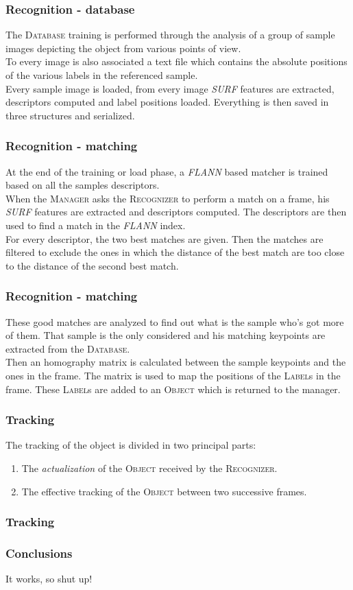 \documentclass{beamer}
\begin{document}
	\begin{frame}
	\frametitle{Recognition - database}
		The \textsc{Database} training is performed through the analysis of a group
		of sample images depicting the object from various points of view.\\
		To every image is also associated a text file which contains the absolute
		positions of the various labels in the referenced sample.\\
		Every sample image is loaded, from every image \emph{SURF} features are
		extracted, descriptors computed and label positions loaded. Everything
		is then saved in three structures and serialized.\\
	\end{frame}

	\begin{frame}
		\frametitle{Recognition - matching}
		At the end of the training or load phase, a \emph{FLANN} based matcher is
		trained based on all the samples descriptors.\\
		When the \textsc{Manager} asks the \textsc{Recognizer} to perform a match
		on a frame, his \emph{SURF} features are extracted and descriptors
		computed. The descriptors are then used to find a match in the
		\emph{FLANN} index.\\
		For every descriptor, the two best matches are given. Then the matches are
		filtered to exclude the ones in which the distance of the best match are
		too close to the distance of the second best match.\\
	\end{frame}

	\begin{frame}
		\frametitle{Recognition - matching}
		These good matches are analyzed to find out what is the sample who's got
		more of them. That sample is the only considered and his matching keypoints
		are extracted from the \textsc{Database}.\\
		Then an homography matrix is calculated between the sample keypoints and the
		ones in the frame. The matrix is used to map the positions of the
		\textsc{Label}s in the frame. These \textsc{Label}s are added to an
		\textsc{Object} which is returned to the manager.\\
	\end{frame}

	\begin{frame}
		\frametitle{Tracking}
		The tracking of the object is divided in two principal parts:
		\begin{enumerate}
			\item The \emph{actualization} of the \textsc{Object} received by the
				\textsc{Recognizer}.
			\item The effective tracking of the \textsc{Object} between two
				successive frames.
		\end{enumerate}
	\end{frame}

	\begin{frame}
		\frametitle{Tracking}
		
	\end{frame}

	\begin{frame}
		\frametitle{Conclusions}
		It works, so shut up!
	\end{frame}
\end{document}
